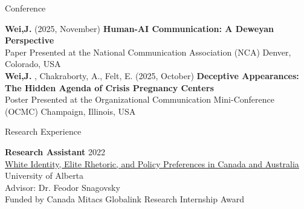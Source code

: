 \documentclass[
	11pt, %
]{resume} %
\begin{document}
\begin{rSection}{Conference}

    
	\textbf{Wei,J.} (2025, November)\textbf{ Human-AI Communication: A Deweyan Perspective}\\
	Paper Presented at the National Communication Association (NCA) \hfill Denver, Colorado, USA \\

	\textbf{Wei,J.} , Chakraborty, A., Felt, E. (2025, October) \textbf{Deceptive Appearances: The Hidden Agenda of Crisis Pregnancy Centers} \\
	Poster Presented at the Organizational Communication Mini-Conference (OCMC) \hfill Champaign, Illinois, USA \\
	
\end{rSection}


\begin{rSection}{Research Experience}
	
	\textbf{Research Assistant} \hfill 2022\\
    \underline{White Identity, Elite Rhetoric, and Policy Preferences in Canada and Australia} \hfill University of Alberta \\
    {Advisor:} Dr. Feodor Snagovsky \\
\textbullet\enspace Funded by Canada Mitacs Globalink Research Internship Award\\

	
\end{rSection}


\end{document}
